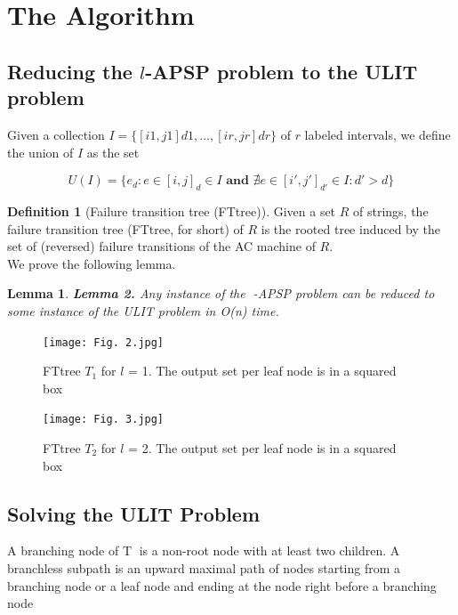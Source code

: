 \documentclass[twocolumn]{article}
\newtheorem{lemma}[theorem]{Lemma}
\begin{document}
\section{The Algorithm}

\subsection{Reducing the $l$-APSP problem to the ULIT problem}

Given a collection  $I = \{ [ i1, j1]d1 , . . . ,  [ir, jr]dr \} $
of $r$ labeled intervals, we define the union of $I$ as the set

$$U(I) = \{ e_d : e \in [i,j]_d \in I \,\, \textbf{and} \,\, \nexists e \in [i', j']_{d'} \in I : d' > d \}$$

\noskip \textbf{Definition 1} (Failure transition tree (FTtree)). Given  a  set  $R$
of strings, the failure transition tree (FTtree, for short) of  $R$
is the rooted tree induced by the set of (reversed) failure 
transitions of the AC machine of  $R$.\\

We prove the following lemma.

\begin{lemma}
\textbf{Lemma 2.} \textit{Any instance of the -APSP problem can be reduced 
to some instance of the ULIT problem in O(n) time.}
\end{lemma}

\begin{figure}
    \centering
    \texttt{[image: Fig. 2.jpg]}
    \caption{FTtree $T_1$ for $l$ = 1. The output set per leaf node is in a squared box}
    \label{fig:my_label2}
\end{figure}

\begin{figure}
    \centering
    \texttt{[image: Fig. 3.jpg]}
    \caption{FTtree $T_2$ for $l$ = 2. The output set per leaf node is in a squared box}
    \label{fig:my_label3}
\end{figure}

\subsection{Solving the ULIT Problem}


A branching node of T is a non-root node with at least 
two  children.  A  branchless subpath is  an  upward  maximal 
path  of  nodes  starting  from  a  branching  node  or  a  leaf 
node and ending at the node right before a branching node
\end{document}
